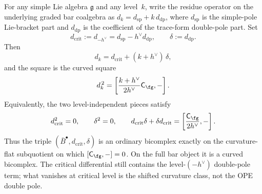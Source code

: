 \begin{theorem}
\label{thm:km-bar-bicomplex}
For any simple Lie algebra $\mathfrak{g}$ and any level~$k$, write
the residue operator on the underlying graded bar coalgebra as
$d_k=d_{\mathrm{sp}}+k\,d_{\mathrm{dp}}$, where
$d_{\mathrm{sp}}$ is the simple-pole Lie-bracket part and
$d_{\mathrm{dp}}$ is the coefficient of the trace-form double-pole
part.  Set
\[
d_{\mathrm{crit}}:=d_{-h^\vee}
=d_{\mathrm{sp}}-h^\vee d_{\mathrm{dp}},
\qquad
\delta:=d_{\mathrm{dp}}.
\]
Then
\begin{equation}\label{eq:bar-level-decomp}
d_k = d_{\mathrm{crit}} + (k + h^\vee)\,\delta,
\end{equation}
and the square is the curved square
\begin{equation}\label{eq:bar-curved-level-square}
d_k^{\,2}
=
\left[
\frac{k+h^\vee}{2h^\vee}\mathsf C_{\fg},-
\right].
\end{equation}
Equivalently, the two level-independent pieces satisfy
\begin{equation}\label{eq:bar-curved-bicomplex-conditions}
d_{\mathrm{crit}}^2 = 0,\qquad
\delta^2 = 0,\qquad
d_{\mathrm{crit}}\delta+\delta d_{\mathrm{crit}}
=
\left[\frac{\mathsf C_{\fg}}{2h^\vee},-\right].
\end{equation}
Thus the triple
$(\bar{B}^\bullet,d_{\mathrm{crit}},\delta)$ is an ordinary
bicomplex exactly on the curvature-flat subquotient on which
$[\mathsf C_{\fg},-]=0$.  On the full bar object it is a curved
bicomplex.  The critical differential still contains the
level-$(-h^\vee)$ double-pole term; what vanishes at critical level
is the shifted curvature class, not the OPE double pole.
\end{theorem}

